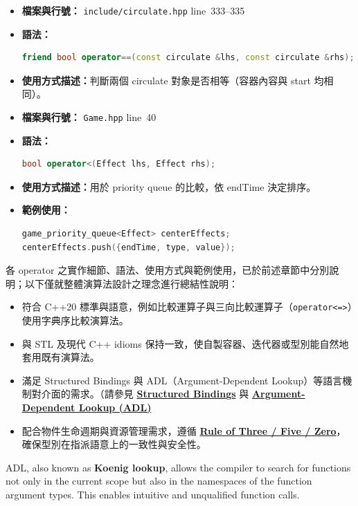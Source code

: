 \documentclass[a4paper,12pt]{article}
\begin{document}
\begin{itemize}
\item \textbf{檔案與行號：} \verb|include/circulate.hpp| line~333--335
\item \textbf{語法：}
\begin{lstlisting}[language=C++]
friend bool operator==(const circulate &lhs, const circulate &rhs);
\end{lstlisting}
\item \textbf{使用方式描述：}判斷兩個 circulate 對象是否相等（容器內容與 start 均相同）。
\end{itemize}
\begin{itemize}
\item \textbf{檔案與行號：} \verb|Game.hpp| line~40
\item \textbf{語法：}
\begin{lstlisting}[language=C++]
bool operator<(Effect lhs, Effect rhs);
\end{lstlisting}
\item \textbf{使用方式描述：}用於 priority queue 的比較，依 endTime 決定排序。
\item \textbf{範例使用：}
\begin{lstlisting}[language=C++]
game_priority_queue<Effect> centerEffects;
centerEffects.push({endTime, type, value});
\end{lstlisting}
\end{itemize}
各 operator 之實作細節、語法、使用方式與範例使用，已於前述章節中分別說明；以下僅就整體演算法設計之理念進行總結性說明：
\begin{itemize}
\item 符合 C++20 標準與語意，例如比較運算子與三向比較運算子（\verb|operator<=>|）使用字典序比較演算法。
\item 與 STL 及現代 C++ idioms 保持一致，使自製容器、迭代器或型別能自然地套用既有演算法。
\item 滿足 Structured Bindings 與 ADL（Argument-Dependent Lookup）等語言機制對介面的需求。（請參見 \hyperref[bindings]{\textbf{Structured Bindings}} 與 \hyperref[adl]{\textbf{Argument-Dependent Lookup (ADL)}}
\item 配合物件生命週期與資源管理需求，遵循 \hyperref[rule]{\textbf{Rule of Three / Five / Zero}}，確保型別在指派語意上的一致性與安全性。
\end{itemize}
\label{adl}
ADL, also known as \textbf{Koenig lookup}, allows the compiler to search for functions not only in the current scope but also in the namespaces of the function argument types. This enables intuitive and unqualified function calls.
\end{document}

